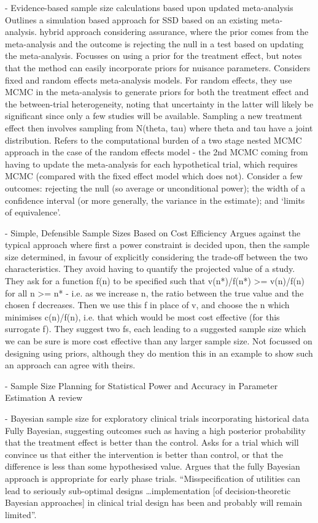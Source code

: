 \documentclass{article} %
\begin{document}
\cite{Sutton2007} - Evidence-based sample size calculations based upon updated meta-analysis
Outlines a simulation based approach for SSD based on an existing meta-analysis. hybrid approach considering assurance, where the prior comes from the meta-analysis and the outcome is rejecting the null in a test based on updating the meta-analysis. Focusses on using a prior for the treatment effect, but notes that the method can easily incorporate priors for nuisance parameters. Considers fixed and random effects meta-analysis models. For random effects, they use MCMC in the meta-analysis to generate priors for both the treatment effect and the between-trial heterogeneity, noting that uncertainty in the latter will likely be significant since only a few studies will be available. Sampling a new treatment effect then involves sampling from N(theta, tau) where theta and tau have a joint distribution. Refers to the computational burden of a two stage nested MCMC approach in the case of the random effects model - the 2nd MCMC coming from having to update the meta-analysis for each hypothetical trial, which requires MCMC (compared with the fixed effect model which does not). Consider a few outcomes: rejecting the null (so average or unconditional power); the width of a confidence interval (or more generally, the variance in the estimate); and `limits of equivalence'.

\cite{Bacchetti2008} - Simple, Defensible Sample Sizes Based on Cost Efficiency
Argues against the typical approach where first a power constraint is decided upon, then the sample size determined, in favour of explicitly considering the trade-off between the two characteristics. They avoid having to quantify the projected value of a study. They ask for a function f(n) to be specified such that v(n*)/f(n*) >= v(n)/f(n) for all n >= n* - i.e. as we increase n, the ratio between the true value and the chosen f decreases. Then we use this f in place of v, and choose the n which minimises c(n)/f(n), i.e. that which would be most cost effective (for this surrogate f). They suggest two fs, each leading to a suggested sample size which we can be sure is more cost effective than any larger sample size. Not focussed on designing using priors, although they do mention this in an example to show such an approach can agree with theirs.

\cite{Maxwell2008} - Sample Size Planning for Statistical Power and Accuracy in Parameter Estimation
A review

\cite{Whitehead2008} - Bayesian sample size for exploratory clinical trials incorporating historical data
Fully Bayesian, suggesting outcomes such as having a high posterior probability that the treatment effect is better than the control. Asks for a trial which will convince us that either the intervention is better than control, or that the difference is less than some hypothesised value. Argues that the fully Bayesian approach is appropriate for early phase trials. ``Misspecification of utilities can lead to seriously sub-optimal designs \ldots implementation [of decision-theoretic Bayesian approaches] in clinical trial design has been and probably will remain limited''.
\end{document}
